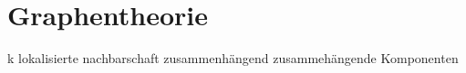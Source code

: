\section{Graphentheorie}
\label{graphentheorie}

k lokalisierte nachbarschaft
zusammenhängend
zusammehängende Komponenten
